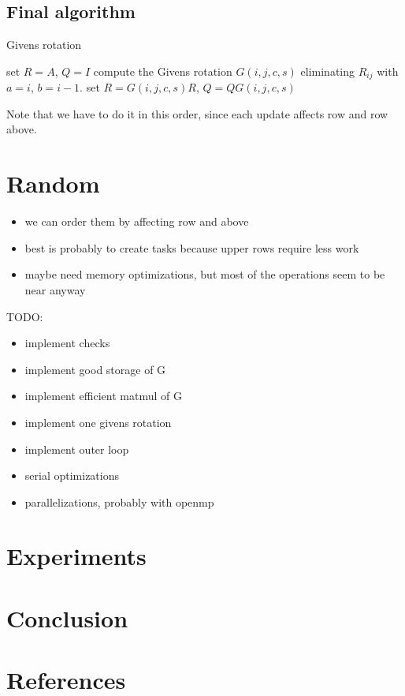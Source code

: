 \documentclass[a4paper]{scrartcl}
\begin{document}
    \subsection{Final algorithm}
        \begin{algorithm}[H]
            \caption{Givens rotation}\label{alg:step}
            \begin{algorithmic}[1]
            \State set $R=A$, $Q=I$
                    \State compute the Givens rotation $G(i,j,c,s)$ eliminating $R_{ij}$ with $a=i$, $b=i-1$.
                    \State set $R=G(i,j,c,s) R$, $Q = Q G(i,j,c,s)$
                    \State
                \EndFor
            \EndFor
            \EndProcedure
            \end{algorithmic}
        \end{algorithm}

        Note that we have to do it in this order, since each update affects row and row above.


\section{Random} 
    \begin{itemize}
        \item we can order them by affecting row and above
        \item best is probably to create tasks because upper rows require less work
        \item maybe need memory optimizations, but most of the operations seem to be near anyway
    \end{itemize}

    TODO:
    \begin{itemize}
        \item implement checks
        \item implement good storage of G
        \item implement efficient matmul of G
        \item implement one givens rotation
        \item implement outer loop
        \item serial optimizations
        \item parallelizations, probably with openmp
    \end{itemize}





\section{Experiments}
\section{Conclusion}
\section{References}
\end{document}
